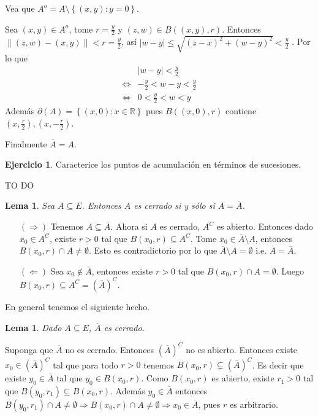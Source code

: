 \documentclass[12pt]{article}
\theoremstyle{plain}
\newtheorem{Lem}[Th]{Lema}             %
\theoremstyle{definition}
\newtheorem{Ej}[Th]{Ejercicio}
\theoremstyle{remark}
\numberwithin{equation}{section}
\newcommand{\bR}{\mathbb{R}}        %
\renewcommand{\leq}{\leqslant}      %
\renewcommand{\:}{\colon}           %
\newcommand{\conj}[1]{\left\lbrace#1\right\rbrace}
\newcommand{\nm}[1]{\left\|#1\right\|} %
\begin{document}
\begin{multicols}{2}
   \begin{ptcb}
   Vea que $A^o=A\setminus\conj{(x,y)\colon y=0}$.\par
    Sea $(x,y)\in A^o$, tome $r=\frac{y}{2}$ y $(z,w)\in B\left((x,y),r\right)$. Entonces $\nm{(z,w)-(x,y)}<r=\frac{y}{2}$, así $|w-y|\leq\sqrt{(z-x)^2+(w-y)^2}<\frac{y}{2}$ .
  Por lo que
  \begin{align*}
    &|w-y| <\frac{y}{2} \\
    \iff & -\frac{y}{2}<w-y<\frac{y}{2} \\
    \iff & 0<\frac{y}{2}<w<y
  \end{align*}
  Además $\partial(A)=\conj{(x,0)\colon x\in\bR}$ pues $B\left((x,0),r\right)$ contiene $(x,\frac{r}{2}), (x,-\frac{r}{2})$.\par
  Finalmente $\overline{A}=A$.
\end{ptcb}

\begin{Ej}
  Caracterice los puntos de acumulación en términos de sucesiones.
\end{Ej}

\begin{ptcb}
TO DO
\end{ptcb}
\begin{Lem}
  Sea $A\subseteq E$. Entonces $A$ es cerrado si y sólo si $A=\overline{A}$.
\end{Lem}
\begin{ptcbp}
\begin{enumerate}
  \item[$(\Rightarrow)$] Tenemos $A\subseteq\overline{A}$. Ahora si $A$ es cerrado, $A^C$ es abierto. Entonces dado $x_0\in A^C$, existe $r>0$ tal que $B(x_0,r)\subseteq A^C$. Tome $x_0\in\overline{A}\setminus A$, entonces $B(x_0,r)\cap A\neq\emptyset$. Esto es contradictorio por lo que $\overline{A}\setminus A=\emptyset$ i.e. $A=\overline{A}$.
   \item[$(\Leftarrow)$] Sea $x_0\not\in\overline{A}$, entonces existe $r>0$ tal que $B(x_0,r)\cap A=\emptyset$. Luego $B(x_0,r)\subseteq A^C=(\overline{A})^C$.
\end{enumerate}
\end{ptcbp}

En general tenemos el siguiente hecho.

\begin{Lem}
  Dado $A\subseteq E$, $\overline{A}$ es cerrado.
\end{Lem}

\begin{ptcbp}
Suponga que $\overline{A}$  no es cerrado. Entonces $(\overline{A})^C$ no es abierto. Entonces existe $x_0\in(\overline{A})^C$ tal que para todo $r>0$ tenemos $B(x_0,r)\subsetneq (\overline{A})^C$. Es decir que existe $y_0\in \overline{A}$ tal que $y_0\in B(x_0,r)$. Como $B(x_0,r)$ es abierto, existe $r_1 > 0$ tal que $B(y_0,r_1)\subseteq B(x_0,r)$. Además $y_0\in \overline{A}$ entonces $B(y_0,r_1)\cap A\neq \emptyset\Rightarrow B(x_0,r)\cap A\neq \emptyset\Rightarrow x_0\in \overline{A}$, pues $r$ es arbitrario.


\end{ptcbp}
\end{multicols}
\end{document}
